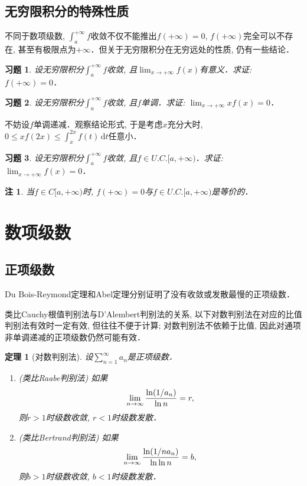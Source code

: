 \documentclass[11pt,a4paper]{ctexart}
\makeatletter
\theoremstyle{thmseries} %
\newtheorem{thm}{定理}[section]
\theoremstyle{exerseries}
\newtheorem{exer}{习题}[section]
\newtheorem*{rem}{注}
\renewenvironment{proof}[1][\proofname]{\par
  \pushQED{\qed}%
  \normalfont \topsep6\p@\@plus6\p@\relax
  \trivlist
  \item[\hskip\labelsep
        \itshape
    #1\@addpunct{}]\ignorespaces
}{%
  \popQED\endtrivlist\@endpefalse
}
\newenvironment{pf}{\begin{proof}[\bfseries\upshape 证\quad]}{\end{proof}}
\newcommand{\bra}[1]{\mathopen{}\left(#1\right)}
\renewcommand{\d}{\mathrm{d}}
\def \nti {\mathnormal{n}\to\infty}
\def \series {\sum_{n=1}^{\infty}}
\makeatother
\begin{document}
\subsection{无穷限积分的特殊性质}
不同于数项级数, $\int_{a}^{+\infty}f$收敛不仅不能推出$f(+\infty)=0$, $f(+\infty)$完全可以不存在, 甚至有极限点为$+\infty$．但关于无穷限积分在无穷远处的性质, 仍有一些结论．
\begin{exer}
	设无穷限积分$\int_{a}^{+\infty}f$收敛, 且$\lim_{x\to+\infty}f(x)$有意义．求证: $f(+\infty)=0$．
\end{exer}
\begin{exer}
	设无穷限积分$\int_{a}^{+\infty}f$收敛, 且$f$单调．求证: $\lim_{x\to+\infty}xf(x)=0$．
\end{exer}
\begin{pf}
	不妨设$f$单调递减．观察结论形式, 于是考虑$x$充分大时, $0\leq xf(2x)\leq\int_{x}^{2x}f(t)\,\d t$任意小．
\end{pf}
\begin{exer}
	设无穷限积分$\int_{a}^{+\infty}f$收敛, 且$f\in U.C.[a,+\infty)$．求证: $\lim_{x\to+\infty}f(x)=0$．
\end{exer}
\begin{rem}
	当$f\in C[a,+\infty)$时, $f(+\infty)=0$与$f\in U.C.[a,+\infty)$是等价的．
\end{rem}


\section{数项级数}
\subsection{正项级数}
Du Bois-Reymond定理和Abel定理分别证明了没有收敛或发散最慢的正项级数．

类比Cauchy根值判别法与D'Alembert判别法的关系, 以下对数判别法在对应的比值判别法有效时一定有效, 但往往不便于计算; 对数判别法不依赖于比值, 因此对通项非单调递减的正项级数仍然可能有效．
\begin{thm}[对数判别法]
	设$\series a_n$是正项级数．
	\begin{enumerate}
		\item (类比Raabe判别法) 如果
		\[\lim_{\nti}\frac{\ln\bra{1/a_n}}{\ln n}=r,\]
		则$r>1$时级数收敛, $r<1$时级数发散．
		\item (类比Bertrand判别法) 如果
		\[\lim_{\nti}\frac{\ln\bra{1/na_n}}{\ln\ln n}=b,\]
		则$b>1$时级数收敛, $b<1$时级数发散．
	\end{enumerate}
\end{thm}
\end{document}

